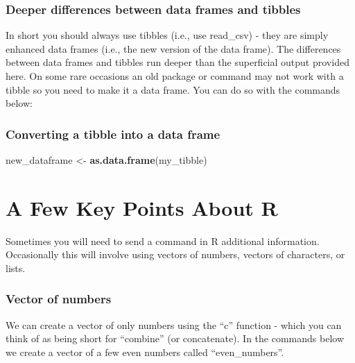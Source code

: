 \documentclass[
]{krantz}
\makeatletter
\newenvironment{Shaded}{\begin{snugshade}}{\end{snugshade}}
\newcommand{\KeywordTok}[1]{\textcolor[rgb]{0.27,0.27,0.27}{\textbf{#1}}}
\newcommand{\NormalTok}[1]{#1}
\newcommand{\StringTok}[1]{\textcolor[rgb]{0.5,0.5,0.5}{#1}}
\newenvironment{kframe}{%
\medskip{}
\setlength{\fboxsep}{.8em}
 \def\at@end@of@kframe{}%
 \ifinner\ifhmode%
  \def\at@end@of@kframe{\end{minipage}}%
  \begin{minipage}{\columnwidth}%
 \fi\fi%
 \def\FrameCommand##1{\hskip\@totalleftmargin \hskip-\fboxsep
 \colorbox{shadecolor}{##1}\hskip-\fboxsep
     \hskip-\linewidth \hskip-\@totalleftmargin \hskip\columnwidth}%
 \MakeFramed {\advance\hsize-\width
   \@totalleftmargin\z@ \linewidth\hsize
   \@setminipage}}%
 {\par\unskip\endMakeFramed%
 \at@end@of@kframe}
\renewenvironment{Shaded}{\begin{kframe}}{\end{kframe}}
\makeatother
\begin{document}
\hypertarget{deeper-differences-between-data-frames-and-tibbles}{%
\subsubsection{Deeper differences between data frames and tibbles}\label{deeper-differences-between-data-frames-and-tibbles}}

In short you should always use tibbles (i.e., use read\_csv) - they are simply enhanced data frames (i.e., the new version of the data frame). The differences between data frames and tibbles run deeper than the superficial output provided here. On some rare occasions an old package or command may not work with a tibble so you need to make it a data frame. You can do so with the commands below:

\hypertarget{converting-a-tibble-into-a-data-frame}{%
\subsubsection{Converting a tibble into a data frame}\label{converting-a-tibble-into-a-data-frame}}

\begin{Shaded}
\begin{Highlighting}[]
\NormalTok{new_dataframe <-}\StringTok{ }\KeywordTok{as.data.frame}\NormalTok{(my_tibble)}
\end{Highlighting}
\end{Shaded}

\hypertarget{a-few-key-points-about-r}{%
\section{A Few Key Points About R}\label{a-few-key-points-about-r}}

Sometimes you will need to send a command in R additional information. Occasionally this will involve using vectors of numbers, vectors of characters, or lists.

\hypertarget{vector-of-numbers}{%
\subsubsection{Vector of numbers}\label{vector-of-numbers}}

We can create a vector of only numbers using the ``c'' function - which you can think of as being short for ``combine'' (or concatenate). In the commands below we create a vector of a few even numbers called ``even\_numbers''.
\end{document}
